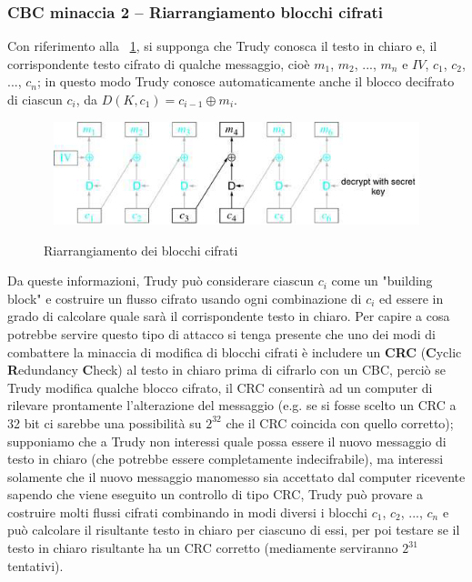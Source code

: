 \subsubsection{CBC minaccia 2 – Riarrangiamento blocchi cifrati}
Con riferimento alla \figurename ~\ref{fig:riarrangiamento_blk_cifrati}, si supponga che Trudy conosca il testo in chiaro e, il corrispondente testo cifrato di qualche messaggio, cioè $m_{1}$, $m_{2}$, ..., $m_{n}$ e $IV$, $c_{1}$, $c_{2}$, ..., $c_{n}$; in questo modo Trudy conosce automaticamente anche il blocco decifrato di ciascun $c_{i}$, da $D(K, c_{1}) = c_{i-1} \oplus m_{i}$.
\begin{figure}[htbp]
	\centering%
	\subfigure%
	{\includegraphics[height=3cm, width=12cm, keepaspectratio]{Immagini/Capitolo3/riarrangiamento_blk_cifrati.png}}
	\caption{Riarrangiamento dei blocchi cifrati \label{fig:riarrangiamento_blk_cifrati}}	
\end{figure}
Da queste informazioni, Trudy può considerare ciascun $c_{i}$ come un "building block" e costruire un flusso cifrato usando ogni combinazione di $c_{i}$ ed essere in grado di calcolare quale sarà il corrispondente testo in chiaro. \newline \newline
Per capire a cosa potrebbe servire questo tipo di attacco si tenga presente che uno dei modi di combattere la minaccia di modifica di blocchi cifrati è includere un \textbf{CRC} (\textbf{C}yclic \textbf{R}edundancy \textbf{C}heck) al testo in chiaro prima di cifrarlo con un CBC, perciò se Trudy modifica qualche blocco cifrato, il CRC consentirà ad un computer di rilevare prontamente l'alterazione del messaggio (e.g. se si fosse scelto un CRC a 32 bit ci sarebbe una possibilità su $2^32$ che il CRC coincida con quello corretto); supponiamo che a Trudy non interessi quale possa essere il nuovo messaggio di testo in chiaro (che potrebbe essere completamente indecifrabile), ma interessi solamente che il nuovo messaggio manomesso sia accettato dal computer ricevente sapendo che viene eseguito un controllo di tipo CRC, Trudy può provare a costruire molti flussi cifrati combinando in modi diversi i blocchi $c_{1}$, $c_{2}$, ..., $c_{n}$ e può calcolare il risultante testo in chiaro per ciascuno di essi, per poi testare se il testo in chiaro risultante ha un CRC corretto (mediamente serviranno $2^31$ tentativi).\newline 
